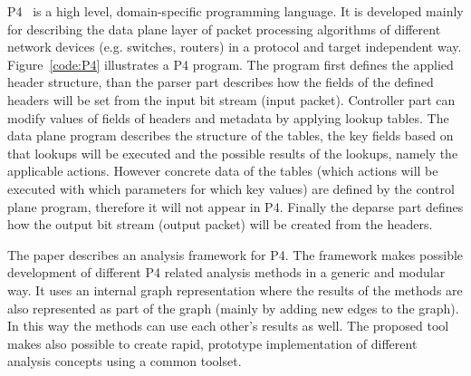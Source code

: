 \documentclass[sigconf]{acmart}
\begin{document}
	
	P4~\cite{p4paper} is a high level, domain-specific programming language. It is developed mainly for
describing the data plane layer of packet processing algorithms of different network
devices (e.g. switches, routers) in a protocol and target independent way. Figure~\ref{code:P4} illustrates a P4 program. The program first defines the applied header structure, than the parser part describes how the fields of the defined headers will be set from the input bit stream (input packet). Controller part can modify values of fields of headers and metadata by applying lookup tables. The data plane program describes the structure of the tables, the key fields based on that lookups will be executed and the possible results of the lookups, namely the applicable actions. However concrete data of the tables (which actions will be executed with which parameters for which key values) are defined by the control plane program, therefore it will not appear in P4. Finally the deparse part defines how the output bit stream (output packet) will be created from the headers.   
	
	The paper describes an analysis framework for P4. The framework makes possible development of different P4 related analysis methods in a generic and modular way. It uses an internal graph representation where the results of the methods are also represented as part of the graph (mainly by adding new edges to the graph). In this way the methods can use each other's results as well. The proposed tool makes also possible to create rapid, prototype implementation of different analysis concepts using a common toolset.  
\end{document}
